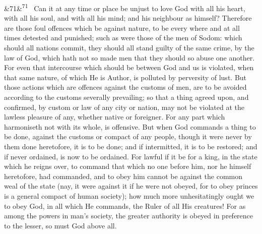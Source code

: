 \documentclass[12pt]{article}
\newcommand{\para}[1][]{\par\noindent\ifx&#1&\else\textsuperscript{\footnotesize #1}~\fi}
\begin{document}
\para[71] Can it at any time or place be unjust to love God with all his heart, with all his soul, and with all his mind; and his neighbour as himself? Therefore are those foul offences which be against nature, to be every where and at all times detested and punished; such as were those of the men of Sodom: which should all nations commit, they should all stand guilty of the same crime, by the law of God, which hath not so made men that they should so abuse one another. For even that intercourse which should be between God and us is violated, when that same nature, of which He is Author, is polluted by perversity of lust. But those actions which are offences against the customs of men, are to be avoided according to the customs severally prevailing; so that a thing agreed upon, and confirmed, by custom or law of any city or nation, may not be violated at the lawless pleasure of any, whether native or foreigner. For any part which harmoniseth not with its whole, is offensive. But when God commands a thing to be done, against the customs or compact of any people, though it were never by them done heretofore, it is to be done; and if intermitted, it is to be restored; and if never ordained, is now to be ordained. For lawful if it be for a king, in the state which he reigns over, to command that which no one before him, nor he himself heretofore, had commanded, and to obey him cannot be against the common weal of the state (nay, it were against it if he were not obeyed, for to obey princes is a general compact of human society); how much more unhesitatingly ought we to obey God, in all which He commands, the Ruler of all His creatures! For as among the powers in man's society, the greater authority is obeyed in preference to the lesser, so must God above all.
\end{document}
